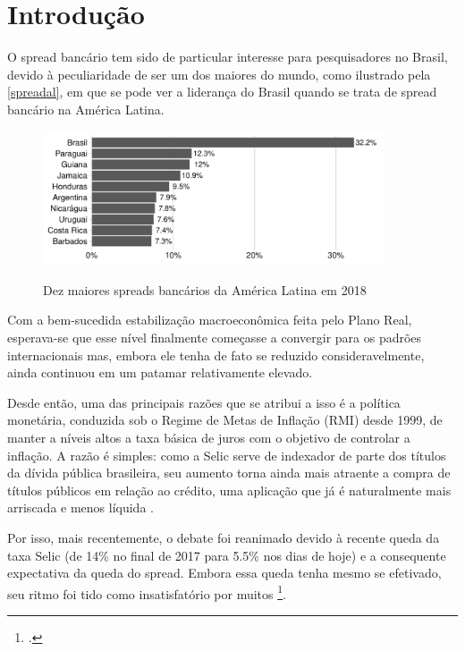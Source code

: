 \documentclass[a4paper,
               article,
               12pt,
               openany,
               oneside,
               english,
               brazil]{abntex2}
\numberwithin{equation}{section}
\begin{document}
\section{Introdução}

    O spread bancário tem sido de particular interesse para pesquisadores no Brasil, devido à peculiaridade de ser um dos maiores do mundo, como ilustrado pela \autoref{spreadal}, em que se pode ver a liderança do Brasil quando se trata de spread bancário na América Latina.

    \begin{figure}[h]
        \centering
        \caption{Dez maiores spreads bancários da América Latina em 2018}
        \includegraphics[width = 0.9\textwidth, scale=1]{spread_AL.pdf}
        \label{spreadal}
    \end{figure}

    Com a bem-sucedida estabilização macroeconômica feita pelo Plano Real, esperava-se que esse nível finalmente começasse a convergir para os padrões internacionais mas, embora ele tenha de fato se reduzido consideravelmente, ainda continuou em um patamar relativamente elevado.

    Desde então, uma das principais razões que se atribui a isso é a política monetária, conduzida sob o Regime de Metas de Inflação (RMI) desde 1999, de manter a níveis altos a taxa básica de juros com o objetivo de controlar a inflação. A razão é simples: como a Selic serve de indexador de parte dos títulos da dívida pública brasileira, seu aumento torna ainda mais atraente a compra de títulos públicos em relação ao crédito, uma aplicação que já é naturalmente mais arriscada e menos líquida \cite[p.~7]{manhica12}.
    
    Por isso, mais recentemente, o debate foi reanimado devido à recente queda da taxa Selic (de 14\% no final de 2017 para 5.5\% nos dias de hoje) e a consequente expectativa da queda do spread. Embora essa queda tenha mesmo se efetivado, seu ritmo foi tido como insatisfatório por muitos \footcite{valor1}. 
    
\end{document}
